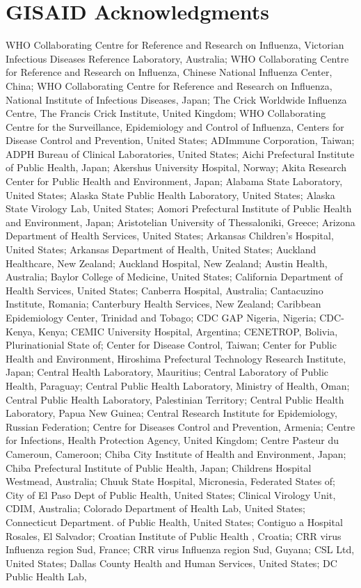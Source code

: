 \appendix
\begin{appendixbox}
\label{appendix:gisaid_acknowledgments}
\section{GISAID Acknowledgments}

WHO Collaborating Centre for Reference and Research on Influenza, Victorian Infectious Diseases Reference Laboratory, Australia; WHO Collaborating Centre for Reference and Research on Influenza, Chinese National Influenza Center, China; WHO Collaborating Centre for Reference and Research on Influenza, National Institute of Infectious Diseases, Japan; The Crick Worldwide Influenza Centre, The Francis Crick Institute, United Kingdom; WHO Collaborating Centre for the Surveillance, Epidemiology and Control of Influenza, Centers for Disease Control and Prevention, United States; ADImmune Corporation, Taiwan; ADPH Bureau of Clinical Laboratories, United States; Aichi Prefectural Institute of Public Health, Japan; Akershus University Hospital, Norway; Akita Research Center for Public Health and Environment, Japan; Alabama State Laboratory, United States; Alaska State Public Health Laboratory, United States; Alaska State Virology Lab, United States; Aomori Prefectural Institute of Public Health and Environment, Japan; Aristotelian University of Thessaloniki, Greece; Arizona Department of Health Services, United States; Arkansas Children's Hospital, United States; Arkansas Department of Health, United States; Auckland Healthcare, New Zealand; Auckland Hospital, New Zealand; Austin Health, Australia; Baylor College of Medicine, United States; California Department of Health Services, United States; Canberra Hospital, Australia; Cantacuzino Institute, Romania; Canterbury Health Services, New Zealand; Caribbean Epidemiology Center, Trinidad and Tobago; CDC GAP Nigeria, Nigeria; CDC-Kenya, Kenya; CEMIC University Hospital, Argentina; CENETROP, Bolivia, Plurinationial State of; Center for Disease Control, Taiwan; Center for Public Health and Environment, Hiroshima Prefectural Technology Research Institute, Japan; Central Health Laboratory, Mauritius; Central Laboratory of Public Health, Paraguay; Central Public Health Laboratory, Ministry of Health, Oman; Central Public Health Laboratory, Palestinian Territory; Central Public Health Laboratory, Papua New Guinea; Central Research Institute for Epidemiology, Russian Federation; Centre for Diseases Control and Prevention, Armenia; Centre for Infections, Health Protection Agency, United Kingdom; Centre Pasteur du Cameroun, Cameroon; Chiba City Institute of Health and Environment, Japan; Chiba Prefectural Institute of Public Health, Japan; Childrens Hospital Westmead, Australia; Chuuk State Hospital, Micronesia, Federated States of; City of El Paso Dept of Public Health, United States; Clinical Virology Unit, CDIM, Australia; Colorado Department of Health Lab, United States; Connecticut Department. of Public Health, United States; Contiguo a Hospital Rosales, El Salvador; Croatian Institute of Public Health , Croatia; CRR virus Influenza region Sud, France; CRR virus Influenza region Sud, Guyana; CSL Ltd, United States; Dallas County Health and Human Services, United States; DC Public Health Lab, 
\end{appendixbox}

